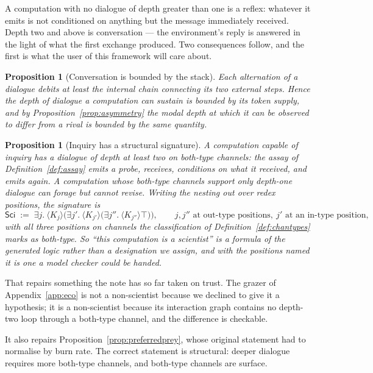 \documentclass[11pt]{article}
\theoremstyle{plain}
\newtheorem{proposition}[theorem]{Proposition}
\theoremstyle{definition}
\begin{document}
A computation with no dialogue of depth greater than one is a reflex: whatever it emits is not
conditioned on anything but the message immediately received. Depth two and above is conversation ---
the environment's reply is answered in the light of what the first exchange produced. Two consequences
follow, and the first is what the user of this framework will care about.

\begin{proposition}[Conversation is bounded by the stack]
\label{prop:dialoguebound}
Each alternation of a dialogue debits at least the internal chain connecting its two external steps.
Hence the depth of dialogue a computation can sustain is bounded by its token supply, and by
Proposition~\ref{prop:asymmetry} the modal depth at which it can be observed to differ from a rival is
bounded by the same quantity.
\end{proposition}

\begin{proposition}[Inquiry has a structural signature]
\label{prop:sciencesig}
A computation capable of inquiry has a dialogue of depth at least two on both-type channels: the assay
of Definition~\ref{def:assay} emits a probe, receives, conditions on what it received, and emits
again. A computation whose both-type channels support only depth-one dialogue can forage but cannot
revise. Writing the nesting out over redex positions, the signature is
\[
\mathsf{Sci} \;:=\; \exists j.\ \langle K_j \rangle\Big(\exists j'.\ \langle K_{j'} \rangle
\big(\exists j''.\ \langle K_{j''} \rangle \top\big)\Big),
\qquad j, j'' \text{ at out-type positions},\ j' \text{ at an in-type position},
\]
with all three positions on channels the classification of Definition~\ref{def:chantypes} marks as
both-type. So ``this computation is a scientist'' is a formula of the generated logic rather than a
designation we assign, and with the positions named it is one a model checker could be handed.
\end{proposition}

That repairs something the note has so far taken on trust. The grazer of Appendix~\ref{app:eco} is not
a non-scientist because we declined to give it a hypothesis; it is a non-scientist because its
interaction graph contains no depth-two loop through a both-type channel, and the difference is
checkable.

It also repairs Proposition~\ref{prop:preferredprey}, whose original statement had to normalise by
burn rate. The correct statement is structural: deeper dialogue requires more both-type channels,
and both-type channels are surface.
\end{document}
